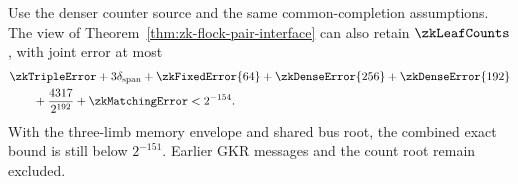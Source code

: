 \begin{theorem}\label{thm:zk-flock-count-interface}
Use the denser counter source and the same common-completion assumptions. The view of Theorem~\ref{thm:zk-flock-pair-interface} can also retain $\zkLeafCounts$, with joint error at most
\[
 \begin{aligned}
 &\zkTripleError+3\delta_{\mathrm{span}}+\zkFixedError{64}
 +\zkDenseError{256}+\zkDenseError{192}\\
 &\hspace{2em}+\frac{4317}{2^{192}}+\zkMatchingError
 <2^{-154}.
 \end{aligned}
\]
With the three-limb memory envelope and shared bus root, the combined exact bound is still below $2^{-151}$. Earlier GKR messages and the count root remain excluded.
\end{theorem}
